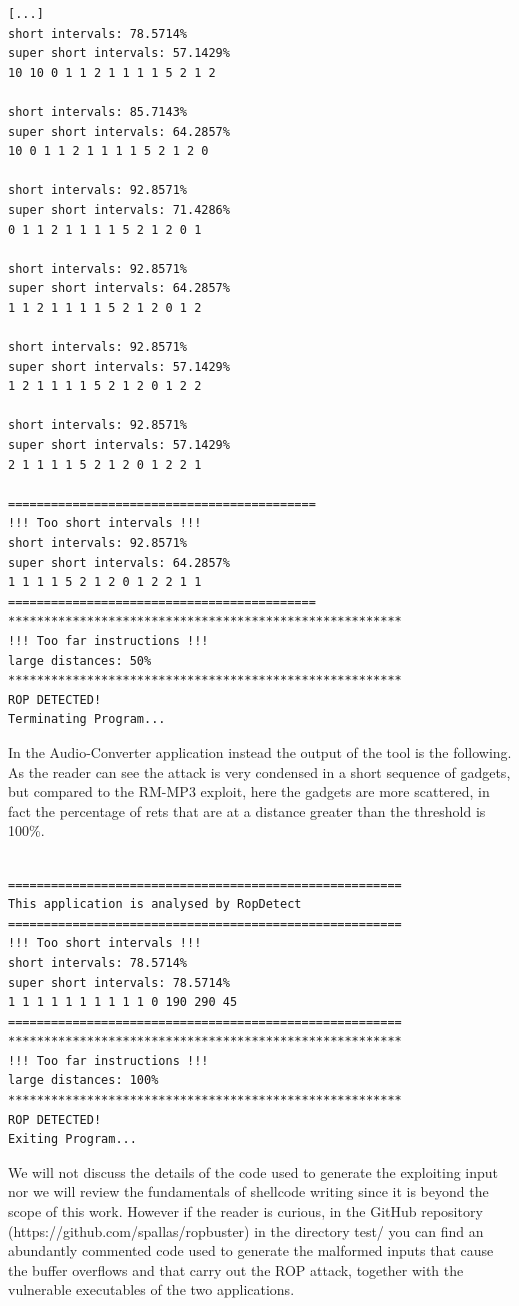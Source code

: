 \documentclass[Lau,binding=0.6cm]{sapthesis}
\begin{document}
\begin{verbatim}
[...]
short intervals: 78.5714%
super short intervals: 57.1429%
10 10 0 1 1 2 1 1 1 1 5 2 1 2

short intervals: 85.7143%
super short intervals: 64.2857%
10 0 1 1 2 1 1 1 1 5 2 1 2 0

short intervals: 92.8571%
super short intervals: 71.4286%
0 1 1 2 1 1 1 1 5 2 1 2 0 1

short intervals: 92.8571%
super short intervals: 64.2857%
1 1 2 1 1 1 1 5 2 1 2 0 1 2

short intervals: 92.8571%
super short intervals: 57.1429%
1 2 1 1 1 1 5 2 1 2 0 1 2 2

short intervals: 92.8571%
super short intervals: 57.1429%
2 1 1 1 1 5 2 1 2 0 1 2 2 1

===========================================
!!! Too short intervals !!!
short intervals: 92.8571%
super short intervals: 64.2857%
1 1 1 1 5 2 1 2 0 1 2 2 1 1
===========================================
*******************************************************
!!! Too far instructions !!!
large distances: 50%
*******************************************************
ROP DETECTED!
Terminating Program...

\end{verbatim}

In the Audio-Converter application instead the output of the tool is the following. As the reader can see the attack is very condensed in a short sequence of gadgets, but compared to the RM-MP3 exploit, here the gadgets are more scattered, in fact the percentage of rets that are at a distance greater than the threshold is 100\%.

\begin{verbatim}

=======================================================
This application is analysed by RopDetect
=======================================================
!!! Too short intervals !!!
short intervals: 78.5714%
super short intervals: 78.5714%
1 1 1 1 1 1 1 1 1 1 0 190 290 45
=======================================================
*******************************************************
!!! Too far instructions !!!
large distances: 100%
*******************************************************
ROP DETECTED!
Exiting Program...

\end{verbatim}

We will not discuss the details of the code used to generate the exploiting input nor we will review the fundamentals of shellcode writing since it is beyond the scope of this work. However if the reader is curious, in the GitHub repository (https://github.com/spallas/ropbuster) in the directory test/ you can find an abundantly commented code used to generate the malformed inputs that cause the buffer overflows and that carry out the ROP attack, together with the vulnerable executables of the two applications.
\end{document}
